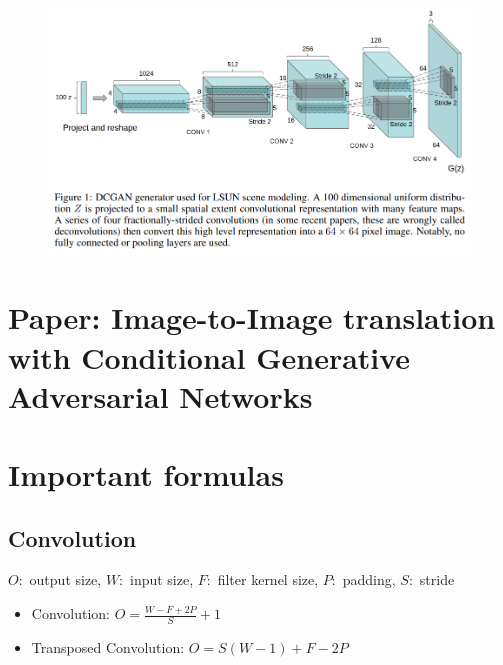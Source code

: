 \documentclass{scrartcl}
\begin{document}
\begin{figure}
	\centering
		\includegraphics[scale=0.5]{img/dcgan_arch}
	\caption{}
	\label{fig:dcgan_arch}
\end{figure}

\section{Paper: Image-to-Image translation with Conditional Generative Adversarial Networks}


\section{Important formulas}
\subsection{Convolution}
$O:$ output size, $W:$ input size, $F:$ filter kernel size, $P:$ padding, $S:$ stride
\begin{itemize}
	\item
		Convolution: $O = \frac{W - F + 2P}{S} + 1$
	\item
		Transposed Convolution: $O = S(W-1) + F - 2P$
\end{itemize}
\end{document}
